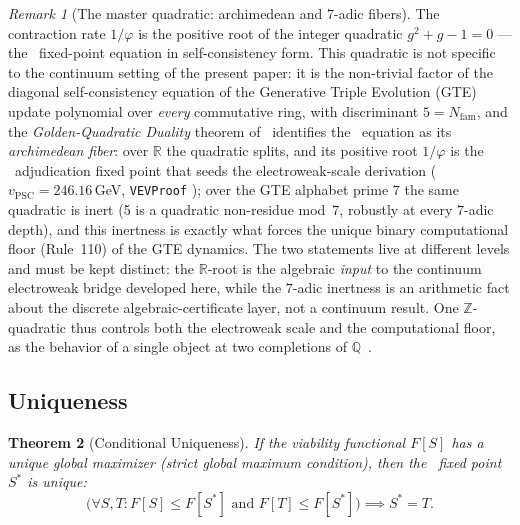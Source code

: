 \documentclass[11pt]{article}
\newtheorem{theorem}{Theorem}[section]
\theoremstyle{remark}
\newtheorem{remark}[theorem]{Remark}
\newcommand{\SRRG}{\text{SRRG}}
\newcommand{\lean}[1]{%
  \penalty-100
  \begingroup
  \def\_{\textunderscore\allowbreak}%
  \texttt{#1}%
  \endgroup
}
\newcommand{\Sstar}{S^*}
\newcommand{\goldenratio}{\varphi}
\begin{document}
\begin{remark}[The master quadratic: archimedean and $7$-adic fibers]
\label{rem:master_quadratic}
The contraction rate $1/\goldenratio$ is the positive root of the integer
quadratic $g^2 + g - 1 = 0$ --- the \SRRG\ fixed-point equation in
self-consistency form. This quadratic is not specific to the continuum
setting of the present paper: it is the non-trivial factor of the diagonal
self-consistency equation of the Generative Triple Evolution (GTE) update
polynomial over \emph{every} commutative ring, with discriminant
$5 = N_{\mathrm{fam}}$, and the \emph{Golden-Quadratic Duality} theorem
of~\cite{SpivackGTEPolynomialWolfram} identifies the \SRRG\ equation as its
\emph{archimedean fiber}: over $\mathbb{R}$ the quadratic splits, and its
positive root $1/\goldenratio$ is the \SRRG\ adjudication fixed point that
seeds the electroweak-scale derivation
($v_{\mathrm{PSC}} = 246.16$\,GeV, \lean{VEVProof}); over the GTE alphabet
prime $7$ the same quadratic is inert (5 is a quadratic non-residue
mod~$7$, robustly at every $7$-adic depth), and this inertness is exactly
what forces the unique binary computational floor (Rule~110) of the GTE
dynamics. The two statements live at different levels and must be kept
distinct: the $\mathbb{R}$-root is the algebraic \emph{input} to the
continuum electroweak bridge developed here, while the $7$-adic inertness
is an arithmetic fact about the discrete algebraic-certificate layer, not
a continuum result. One $\mathbb{Z}$-quadratic thus controls both the
electroweak scale and the computational floor, as the behavior of a single
object at two completions of $\mathbb{Q}$~\cite{SpivackGTEPolynomialWolfram}.
\end{remark}

\subsection{Uniqueness}
\label{sec:uniqueness}

\begin{theorem}[Conditional Uniqueness]
\label{thm:uniqueness}
If the viability functional $F[S]$ has a unique global maximizer (strict global
maximum condition), then the \SRRG\ fixed point $\Sstar$ is unique:
\begin{equation}
\bigl(\forall S,T: F[S] \leq F[\Sstar] \text{ and } F[T] \leq F[\Sstar] \bigr)
\implies \Sstar = T.
\end{equation}
\end{theorem}
\end{document}
